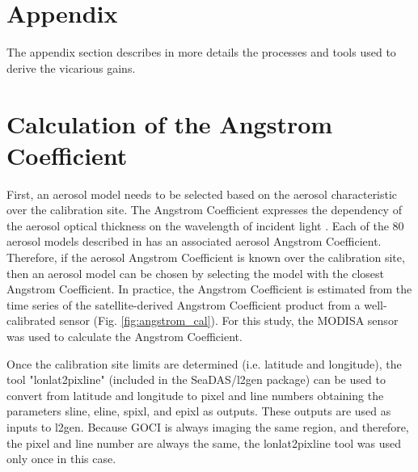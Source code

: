 \documentclass[]{interact}
\theoremstyle{plain}%
\theoremstyle{definition}
\theoremstyle{remark}
\begin{document}
\appendix
\section*{Appendix}
The appendix section describes in more details the processes and tools used to derive the vicarious gains.

\section{Calculation of the Angstrom Coefficient}\label{sec:appendix_Angstrom}
First, an aerosol model needs to be selected based on the aerosol characteristic over the calibration site. The Angstrom Coefficient expresses the dependency of the aerosol optical thickness on the wavelength of incident light \citep{Wang:2005}. Each of the 80 aerosol models described in \citep{Ahmad2010} has an associated aerosol Angstrom Coefficient. Therefore, if the aerosol Angstrom Coefficient is known over the calibration site, then an aerosol model can be chosen by selecting the model with the closest Angstrom Coefficient. In practice, the Angstrom Coefficient is estimated from the time series of the satellite-derived Angstrom Coefficient product from a well-calibrated sensor (Fig. \ref{fig:angstrom_cal}). For this study, the MODISA sensor was used to calculate the Angstrom Coefficient.

Once the calibration site limits are determined (i.e. latitude and longitude), the tool "lonlat2pixline" (included in the SeaDAS/l2gen package) can be used to convert from latitude and longitude to pixel and line numbers obtaining the parameters sline, eline, spixl, and epixl as outputs. These outputs are used as inputs to l2gen. Because GOCI is always imaging the same region, and therefore, the pixel and line number are always the same, the lonlat2pixline tool was used only once in this case.
\end{document}
